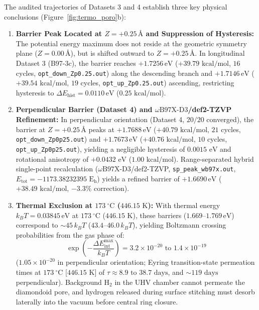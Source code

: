 \documentclass[10pt,twocolumn,a4paper]{article}
\begin{document}
The audited trajectories of Datasets 3 and 4 establish three key physical conclusions (Figure~\ref{fig:termo_poro}b):
\begin{enumerate}
    \item \textbf{Barrier Peak Located at $Z = +0.25\,\text{\AA}$ and Suppression of Hysteresis:} The potential energy maximum does not reside at the geometric symmetry plane ($Z = 0.00\,\text{\AA}$), but is shifted outward to $Z = +0.25\,\text{\AA}$. In longitudinal Dataset 3 (B97-3c), the barrier reaches $\mathbf{+1.7256}\,\text{eV}$ ($+39.79\text{ kcal/mol}$, $16$ cycles, \texttt{opt\_down\_Zp0.25.out}) along the descending branch and $\mathbf{+1.7146}\,\text{eV}$ ($+39.54\text{ kcal/mol}$, $19$ cycles, \texttt{opt\_up\_Zp0.25.out}) ascending, restricting hysteresis to $\Delta E_{\text{hist}} = 0.0110\,\text{eV}$ ($0.25\text{ kcal/mol}$).
    \item \textbf{Perpendicular Barrier (Dataset 4) and $\omega\text{B97X-D3}$/def2-TZVP Refinement:} In perpendicular orientation (Dataset 4, $20/20$ converged), the barrier at $Z = +0.25\,\text{\AA}$ peaks at $\mathbf{+1.7688}\,\text{eV}$ ($+40.79\text{ kcal/mol}$, $21$ cycles, \texttt{opt\_down\_Zp0p25.out}) and $\mathbf{+1.7673}\,\text{eV}$ ($+40.76\text{ kcal/mol}$, $10$ cycles, \texttt{opt\_up\_Zp0p25.out}), yielding a negligible hysteresis of $0.0015\text{ eV}$ and rotational anisotropy of $+0.0432\text{ eV}$ ($1.00\text{ kcal/mol}$). Range-separated hybrid single-point recalculation ($\omega\text{B97X-D3}$/def2-TZVP, \texttt{sp\_peak\_wb97x.out}, $E_{\text{tot}} = -1173.38232395\text{ E}_\text{h}$) yields a refined barrier of $\mathbf{+1.6690}\,\text{eV}$ ($+38.49\text{ kcal/mol}$, $-3.3\%$ correction).
    \item \textbf{Thermal Exclusion at $173\ ^\circ\text{C}$ ($446.15\text{ K}$):} With thermal energy $k_B T = 0.03845\,\text{eV}$ at $173\ ^\circ\text{C}$ ($446.15\text{ K}$), these barriers ($1.669\text{--}1.769\,\text{eV}$) correspond to ${\sim}45\,k_B T$ ($43.4\text{--}46.0\,k_B T$), yielding Boltzmann crossing probabilities from the gas phase of:
    \begin{equation}
    \exp\!\left(-\frac{\Delta E_{\text{int}}^{\max}}{k_B T}\right) = 3.2 \times 10^{-20}\text{ to }1.4 \times 10^{-19}
    \end{equation}
    ($1.05 \times 10^{-20}$ in perpendicular orientation; Eyring transition-state permeation times at $173\ ^\circ\text{C}$ [$446.15\text{ K}$] of $\tau \approx 8.9\text{ to }38.7\text{ days}$, and $\sim 119\text{ days}$ perpendicular). Background $\text{H}_2$ in the UHV chamber cannot permeate the diamondoid pore, and hydrogen released during surface stitching must desorb laterally into the vacuum before central ring closure.
\end{enumerate}
\end{document}
